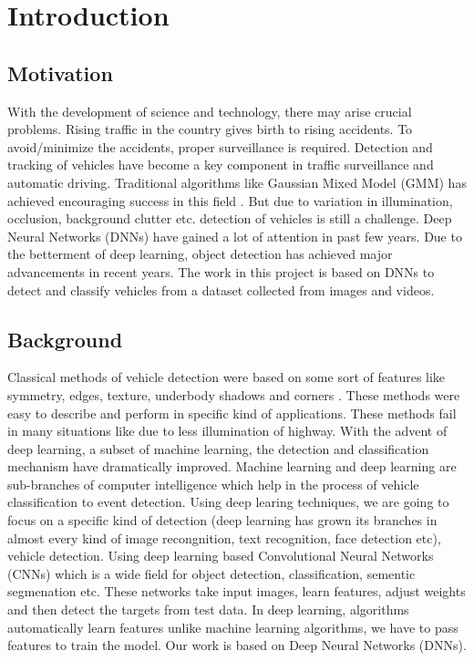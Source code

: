\chapter{Introduction}
\label{1}
\section{Motivation}

With the development of science and technology, there may arise crucial 
problems. Rising traffic in the country gives birth to rising accidents. To 
avoid/minimize the accidents, proper surveillance is required. Detection 
and tracking of vehicles have become a key component in traffic 
surveillance and automatic driving. Traditional algorithms like Gaussian 
Mixed Model (GMM) has achieved encouraging success in this field \cite{chap_1_article:1}. But due 
to variation in illumination, occlusion, background clutter etc. detection 
of vehicles is still a challenge. 
Deep Neural Networks (DNNs) have gained a lot of attention in 
past few years. Due to the betterment of deep learning, object 
detection has achieved major advancements in recent years. The work 
in this project is based on DNNs to detect and classify vehicles from 
a dataset collected from images and videos.

\section{Background}

Classical methods of vehicle detection were based on some 
sort of features like symmetry, edges, texture, underbody shadows 
and corners \cite{chap_1_article:2}. These methods were easy to describe and perform 
in specific kind of applications. These methods fail in many situations 
like due to less illumination of highway. With the advent of 
deep learning, a subset of machine learning, the detection and 
classification mechanism have dramatically improved. Machine learning 
and deep learning are sub-branches of computer intelligence which help 
in the process of vehicle classification to event detection. 
Using deep learing techniques, we are going to focus on a specific kind 
of detection (deep learning has grown its branches in almost every 
kind of image recongnition, text recognition, face detection etc), vehicle 
detection. Using deep learning based Convolutional Neural Networks (CNNs) 
which is a wide field for object detection, classification, sementic 
segmenation etc. These networks take input images, learn features, adjust 
weights and then detect the targets from test data. In deep learning, 
algorithms automatically learn features unlike machine 
learning algorithms, we have to pass features to train the 
model. Our work is based on Deep Neural Networks (DNNs).

